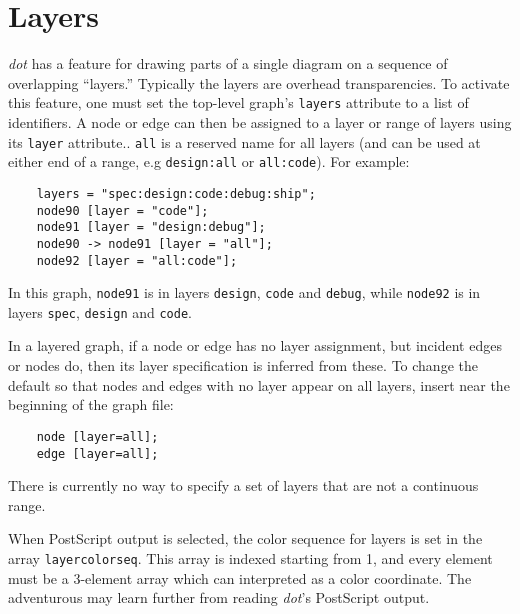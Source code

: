 \documentclass[11pt]{article}
\def\dot{{\it dot}}
\begin{document}
\section{Layers}
{\dot} has a feature for drawing parts of a single diagram on
a sequence of overlapping ``layers.'' Typically the layers are
overhead transparencies.  To activate this feature, one must
set the top-level graph's {\tt layers} attribute to a list of identifiers.
A node or edge can then be assigned to a layer or range of layers
using its {\tt layer} attribute..
{\tt all} is a reserved name for all layers (and can be
used at either end of a range, e.g {\tt design:all} or {\tt all:code}).
For example:
\begin{verbatim}
    layers = "spec:design:code:debug:ship";
    node90 [layer = "code"];
    node91 [layer = "design:debug"]; 
    node90 -> node91 [layer = "all"];
    node92 [layer = "all:code"];
\end{verbatim}
In this graph, {\tt node91} is in layers {\tt design}, {\tt code}
and {\tt debug}, while {\tt node92} is in layers {\tt spec},
{\tt design} and {\tt code}.

In a layered graph, if a node or edge has no layer assignment,
but incident edges or nodes do, then its layer specification
is inferred from these.  To change the default so that nodes
and edges with no layer appear on all layers, insert near
the beginning of the graph file:

\begin{verbatim}
    node [layer=all];
    edge [layer=all];
\end{verbatim}

There is currently no way to specify a set of layers that are
not a continuous range.

When PostScript output is selected, the color sequence for layers
is set in the array {\tt layercolorseq}.  This array is indexed
starting from 1, and every element must be a 3-element array which can
interpreted as a color coordinate.  The adventurous may
learn further from reading {\dot}'s PostScript output.

\end{document}
